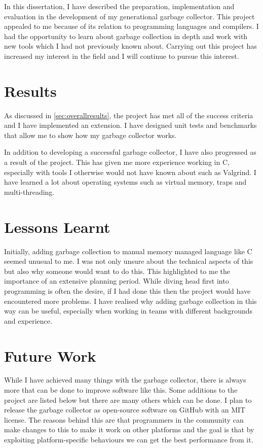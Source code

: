 \documentclass[../diss.tex]{subfiles}
\begin{document}
In this dissertation, I have described the preparation, implementation and evaluation in the development of my generational garbage collector. This project appealed to me because of its relation to programming languages and compilers. I had the opportunity to learn about garbage collection in depth and work with new tools which I had not previously known about. Carrying out this project has increased my interest in the field and I will continue to pursue this interest.

\section{Results}

As discussed in \cref{sec:overallresults}, the project has met all of the success criteria and I have implemented an extension. I have designed unit tests and benchmarks that allow me to show how my garbage collector works. 

In addition to developing a successful garbage collector, I have also progressed as a result of the project. This has given me more experience working in C, especially with tools I otherwise would not have known about such as Valgrind. I have learned a lot about operating systems such as virtual memory, traps and multi-threading.

\section{Lessons Learnt}

Initially, adding garbage collection to manual memory managed language like C seemed unusual to me. I was not only unsure about the technical aspects of this but also why someone would want to do this. This highlighted to me the importance of an extensive planning period. While diving head first into programming is often the desire, if I had done this then the project would have encountered more problems. I have realised why adding garbage collection in this way can be useful, especially when working in teams with different backgrounds and experience.

\section{Future Work} \label{sec:futurework}

While I have achieved many things with the garbage collector, there is always more that can be done to improve software like this. Some additions to the project are listed below but there are many others which can be done. I plan to release the garbage collector as open-source software on GitHub with an MIT license. The reasons behind this are that programmers in the community can make changes to this to make it work on other platforms and the goal is that by exploiting platform-specific behaviours we can get the best performance from it.
\end{document}
